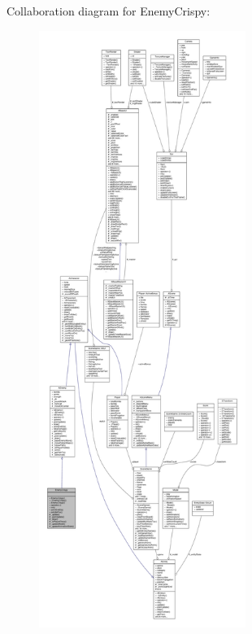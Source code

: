 Collaboration diagram for Enemy\+Crispy\+:
\nopagebreak
\begin{figure}[H]
\begin{center}
\leavevmode
\includegraphics[height=550pt]{class_enemy_crispy__coll__graph}
\end{center}
\end{figure}
